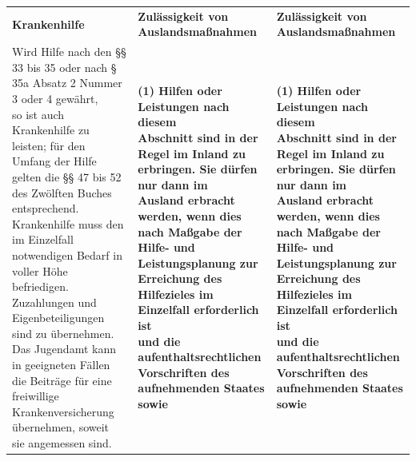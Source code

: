 \documentclass[10pt,a4paper,landscape]{article}
\begin{document}
\begin{longtable}{|L{8.2cm}|L{8.2cm}|L{8.2cm}|}
\hhline{|---|}
\textbf{\textcolor{diffred}{Krankenhilfe}} & \textbf{Zulässigkeit von Auslandsmaßnahmen } & \textbf{Zulässigkeit von Auslandsmaßnahmen } \\
\hhline{|---|}
\textcolor{diffred}{Wird Hilfe} nach \textcolor{diffred}{den \S{}\S{} 33 bis 35 oder} nach  \newline \textcolor{diffred}{\S{} 35a Absatz 2 Nummer 3 oder 4 gewährt,  \newline so ist auch Krankenhilfe zu leisten; für den  \newline Umfang} der \textcolor{diffred}{Hilfe gelten die \S{}\S{} 47 bis 52}  \newline des \textcolor{diffred}{Zwölften Buches entsprechend.  \newline Krankenhilfe muss den} im Einzelfall  \newline \textcolor{diffred}{notwendigen Bedarf in voller Höhe  \newline befriedigen. Zuzahlungen} und  \newline \textcolor{diffred}{Eigenbeteiligungen sind zu übernehmen.  \newline Das Jugendamt kann in geeigneten Fällen}  \newline die \textcolor{diffred}{Beiträge für eine freiwillige  \newline Krankenversicherung übernehmen, soweit  \newline sie angemessen sind.} & \textbf{(1) Hilfen oder Leistungen nach diesem  \newline Abschnitt sind in der Regel im Inland zu  \newline erbringen. Sie dürfen nur dann im  \newline Ausland erbracht werden, wenn dies  \newline nach Maßgabe der Hilfe- und  \newline Leistungsplanung zur Erreichung des  \newline Hilfezieles im Einzelfall erforderlich ist  \newline und die aufenthaltsrechtlichen  \newline Vorschriften des aufnehmenden Staates  \newline sowie } & \textbf{(1) Hilfen oder Leistungen nach diesem  \newline Abschnitt sind in der Regel im Inland zu  \newline erbringen. Sie dürfen nur dann im  \newline Ausland erbracht werden, wenn dies  \newline nach Maßgabe der Hilfe- und  \newline Leistungsplanung zur Erreichung des  \newline Hilfezieles im Einzelfall erforderlich ist  \newline und die aufenthaltsrechtlichen  \newline Vorschriften des aufnehmenden Staates  \newline sowie } \\

\end{longtable}
\end{document}
